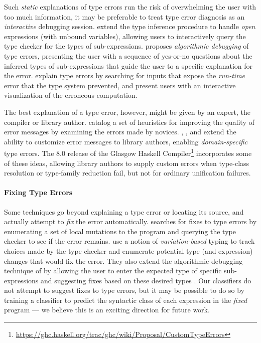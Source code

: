 Such \emph{static} explanations of type errors run the risk of
overwhelming the user with too much information, it may be preferable to
treat type error diagnosis as an \emph{interactive} debugging session.
%
\citet{Bernstein1995-yj} extend the type inference procedure to handle
\emph{open} expressions (\ie with unbound variables), allowing users to
interactively query the type checker for the types of sub-expressions.
%
\citet{Chitil2001-td} proposes \emph{algorithmic debugging} of type
errors, presenting the user with a sequence of yes-or-no questions about
the inferred types of sub-expressions that guide the user to a specific
explanation for the error.
%
\citet{Seidel2016-ul} explain type errors by searching for inputs that
expose the \emph{run-time} error that the type system prevented, and
present users with an interactive visualization of the erroneous
computation.

The best explanation of a type error, however, might be given by an
expert, \eg the compiler or library author.
%
\citet{Hage2006-hc} catalog a set of heuristics for
improving the quality of error messages by examining the errors made by
novices.
%
\citet{Heeren2003-db}, \citet{Christiansen2014-qc}, and
\citet{Serrano2016-oo} extend the ability to customize error messages to
library authors, enabling \emph{domain-specific} type errors.
%
The 8.0 release of the
Glasgow Haskell Compiler\footnote{\url{https://ghc.haskell.org/trac/ghc/wiki/Proposal/CustomTypeErrors}}
incorporates some of these ideas, allowing library authors to supply
custom errors when type-class resolution or type-family reduction fail,
but not for ordinary unification failures.


\paragraph{Fixing Type Errors}
Some techniques go beyond explaining a type error or locating its
source, and actually attempt to \emph{fix} the error automatically.
%
\citet{Lerner2007-dt} searches for fixes to type errors by enumerating a
set of local mutations to the program and querying the type checker to
see if the error remains.
%
\citet{Chen2014-gd} use a notion of \emph{variation-based} typing to
track choices made by the type checker and enumerate potential type (and
expression) changes that would fix the error.
%
They also extend the algorithmic debugging technique of
\citeauthor{Chitil2001-td} by allowing the user to enter the expected
type of specific sub-expressions and suggesting fixes based on these
desired types \citeyear{Chen2014-vm}.
%
Our classifiers do not attempt to suggest fixes to type errors, but it
may be possible to do so by training a classifier to predict the
syntactic class of each expression in the \emph{fixed} program --- we
believe this is an exciting direction for future work.

